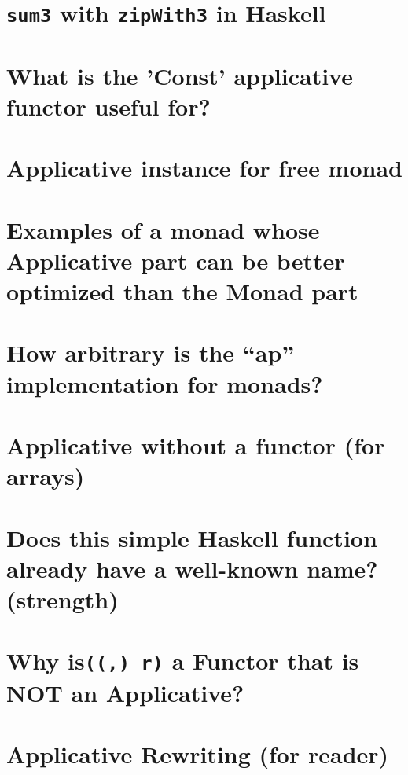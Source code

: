 \documentclass{book}%
\begin{document}
\section{{\texttt{sum3}} with {\texttt{zipWith3}} in Haskell}


\section{What is the 'Const' applicative functor useful for?}


\section{Applicative instance for free monad}


\section{Examples of a monad whose Applicative part can be better optimized than the Monad part}


\section{How arbitrary is the “ap” implementation for monads?}


\section{Applicative without a functor (for arrays)}


\section{Does this simple Haskell function already have a well-known name? (strength)}


\section{Why is{\texttt{((,) r)}} a Functor that is NOT an Applicative?}


\section{Applicative Rewriting (for reader)}

\end{document}
